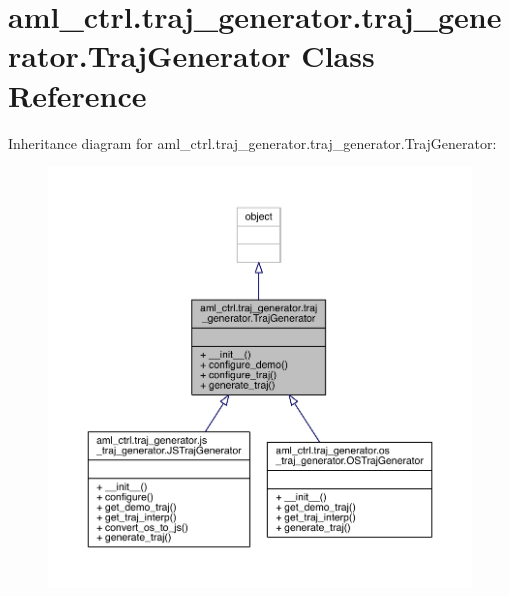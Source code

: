 \hypertarget{classaml__ctrl_1_1traj__generator_1_1traj__generator_1_1_traj_generator}{}\section{aml\+\_\+ctrl.\+traj\+\_\+generator.\+traj\+\_\+generator.\+Traj\+Generator Class Reference}
\label{classaml__ctrl_1_1traj__generator_1_1traj__generator_1_1_traj_generator}


Inheritance diagram for aml\+\_\+ctrl.\+traj\+\_\+generator.\+traj\+\_\+generator.\+Traj\+Generator\+:\nopagebreak
\begin{figure}[H]
\begin{center}
\leavevmode
\includegraphics[width=350pt]{classaml__ctrl_1_1traj__generator_1_1traj__generator_1_1_traj_generator__inherit__graph}
\end{center}
\end{figure}


